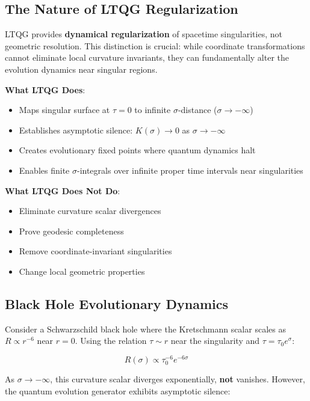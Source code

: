 \documentclass[12pt,a4paper]{article}
\begin{document}
\subsection{The Nature of LTQG Regularization}

LTQG provides \textbf{dynamical regularization} of spacetime singularities, not geometric resolution. This distinction is crucial: while coordinate transformations cannot eliminate local curvature invariants, they can fundamentally alter the evolution dynamics near singular regions.

\textbf{What LTQG Does}: 
\begin{itemize}
\item Maps singular surface at $\tau = 0$ to infinite $\sigma$-distance ($\sigma \to -\infty$)
\item Establishes asymptotic silence: $K(\sigma) \to 0$ as $\sigma \to -\infty$
\item Creates evolutionary fixed points where quantum dynamics halt
\item Enables finite $\sigma$-integrals over infinite proper time intervals near singularities
\end{itemize}

\textbf{What LTQG Does Not Do}:
\begin{itemize}
\item Eliminate curvature scalar divergences
\item Prove geodesic completeness
\item Remove coordinate-invariant singularities
\item Change local geometric properties
\end{itemize}

\subsection{Black Hole Evolutionary Dynamics}

Consider a Schwarzschild black hole where the Kretschmann scalar scales as $R \propto r^{-6}$ near $r = 0$. Using the relation $\tau \sim r$ near the singularity and $\tau = \tau_0 e^{\sigma}$:

\begin{equation}
R(\sigma) \propto \tau_0^{-6} e^{-6\sigma}
\end{equation}

As $\sigma \to -\infty$, this curvature scalar diverges exponentially, \textbf{not} vanishes. However, the quantum evolution generator exhibits asymptotic silence:
\end{document}
